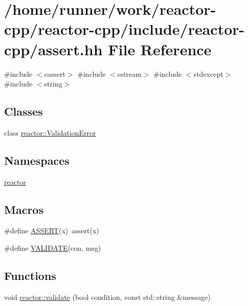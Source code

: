 \hypertarget{assert_8hh}{}\section{/home/runner/work/reactor-\/cpp/reactor-\/cpp/include/reactor-\/cpp/assert.hh File Reference}
\label{assert_8hh}
{\ttfamily \#include $<$cassert$>$}\newline
{\ttfamily \#include $<$sstream$>$}\newline
{\ttfamily \#include $<$stdexcept$>$}\newline
{\ttfamily \#include $<$string$>$}\newline
\subsection*{Classes}
\begin{DoxyCompactItemize}
\item 
class \hyperlink{classreactor_1_1ValidationError}{reactor\+::\+Validation\+Error}
\end{DoxyCompactItemize}
\subsection*{Namespaces}
\begin{DoxyCompactItemize}
\item 
 \hyperlink{namespacereactor}{reactor}
\end{DoxyCompactItemize}
\subsection*{Macros}
\begin{DoxyCompactItemize}
\item 
\#define \hyperlink{assert_8hh_aca68c0d4ac8df0838e209fb5300f7be3}{A\+S\+S\+E\+RT}(x)~assert(x)
\item 
\#define \hyperlink{assert_8hh_aa8944c5f0d4c2f0c3643c36ab4967a17}{V\+A\+L\+I\+D\+A\+TE}(con,  msg)
\end{DoxyCompactItemize}
\subsection*{Functions}
\begin{DoxyCompactItemize}
\item 
void \hyperlink{namespacereactor_afb17997129c7498eff1148813c8970d0}{reactor\+::validate} (bool condition, const std\+::string \&message)
\end{DoxyCompactItemize}


